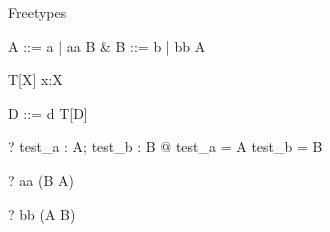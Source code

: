 \begin{zsection}
  \SECTION Freetypes
\end{zsection}

\begin{zed}
  A ::= a | aa \ldata B \rdata &
  B ::= b | bb \ldata A \rdata
\end{zed}

\begin{schema}{T}[X]
  x:X
\end{schema} 

\begin{zed}
  D ::= d \ldata T[D] \rdata
\end{zed}

\begin{zed}
  \vdash? \exists test\_a : \power A; test\_b : \power B @
     test\_a = A \land
     test\_b = B
\end{zed}
\begin{zed} \vdash? aa \in \power (B \cross A) \end{zed}
\begin{zed} \vdash? bb \in \power (A \cross B) \end{zed}

